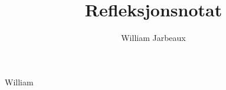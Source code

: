 \documentclass{article}
\title{Refleksjonsnotat}
\author{William Jarbeaux}
\begin{document}
    \maketitle
    William
\end{document}
